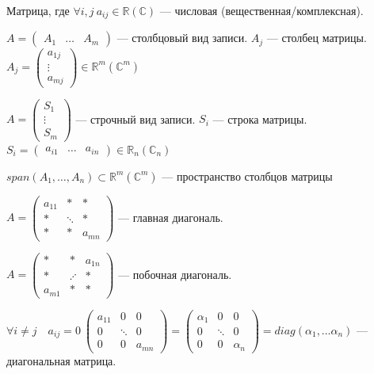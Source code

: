 \documentclass[twoside]{book}
\begin{document}
Матрица, где $ \forall i,j\ a_{ij} \in \mathbb{R}(\mathbb{C}) $ --- числовая (вещественная/комплексная).


\( A =
\begin{pmatrix}
    A_{1} & \ldots & A_{m}
\end{pmatrix}\) --- столбцовый вид записи.
$A_j$ --- столбец матрицы.
\( A_j =
\begin{pmatrix}
    a_{1j} \\
    \vdots \\
    a_{mj}
\end{pmatrix}
\in \mathbb{R}^m(\mathbb{C}^m)\)

\( A =
\begin{pmatrix}
    S_1    \\
    \vdots \\
    S_m
\end{pmatrix}\) --- строчный вид записи.
$S_i$ --- строка матрицы.
\( S_i =
\begin{pmatrix}
    a_{i1} & \ldots & a_{in}
\end{pmatrix}
\in \mathbb{R}_n(\mathbb{C}_n)\)

\( span(A_1, \ldots, A_n) \subset \mathbb{R}^m(\mathbb{C}^m)\) --- пространство столбцов матрицы


\( A =
\begin{pmatrix}
    a_{11} & *      & *      \\
    *      & \ddots & *      \\
    *      & *      & a_{mn}
\end{pmatrix}\) --- главная диагональ.


\( A =
\begin{pmatrix}
    *      & *       & a_{1n} \\
    *      & \iddots & *      \\
    a_{m1} & *       & *
\end{pmatrix}\) --- побочная диагональ.

\( \forall i \neq j \quad a_{ij} = 0\:
\begin{pmatrix}
    a_{11} & 0      & 0      \\
    0      & \ddots & 0      \\
    0      & 0      & a_{mn}
\end{pmatrix} =
\begin{pmatrix}
    \alpha_{1} & 0      & 0          \\
    0          & \ddots & 0          \\
    0          & 0      & \alpha_{n}
\end{pmatrix}
= diag(\alpha_1, \ldots \alpha_n)
\) --- диагональная матрица.
\end{document}
